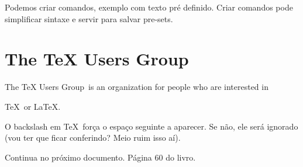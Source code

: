 \documentclass{article}
\begin{document}
Podemos criar comandos, exemplo com texto pré definido.
Criar comandos pode simplificar sintaxe e servir para salvar
pre-sets.

\newcommand{\TUG}{TeX Users Group}

\section{The \TUG}

The \TUG\ is an organization for people who are interested in 

\TeX\ or \LaTeX.

\newcommand{\TUG}{\textsc{TeX Users Group}}

O backslash em \TeX\ força o espaço seguinte a aparecer.
Se não, ele será ignorado
(vou ter que ficar conferindo? Meio ruim isso aí).

Continua no próximo documento. Página 60 do livro.
\end{document}
